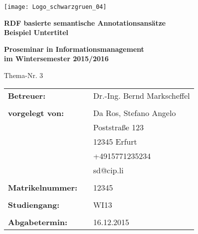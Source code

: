 \documentclass[main.tex]{subfiles}
\begin{document}
\begin{titlepage}
\begin{minipage}{1\textwidth}
\flushright 
   \texttt{[image: Logo\_schwarzgruen\_04]}
\end{minipage}

\vspace{3cm}
\begin{center}
\textbf{\LARGE{RDF basierte semantische Annotationsansätze}}
\\
\textbf{Beispiel Untertitel}
\end{center}
\vspace{1.5cm}

\begin{center}
\textbf{Proseminar in Informationsmanagement\\ im Wintersemester 2015/2016}
\end{center}

\vspace{0.5cm}
\begin{center}
	Thema-Nr. 3
\end{center}

\vspace{2cm}

\begin{flushleft}
\begin{tabular}{lll}
\textbf{Betreuer:} & &  Dr.-Ing. Bernd Markscheffel\\
& & \\
\textbf{vorgelegt von:}& & Da Ros, Stefano Angelo\\
& & Poststraße 123\\
& & 12345 Erfurt\\
& & +4915771235234\\
& & sd@cip.li\\
& & \\
\textbf{Matrikelnummer:} & & 12345\\
& & \\

\textbf{Studiengang:} & & WI13\\
& & \\

\textbf{Abgabetermin:} & & 16.12.2015
\end{tabular}
\end{flushleft}
\end{titlepage}
\end{document}

